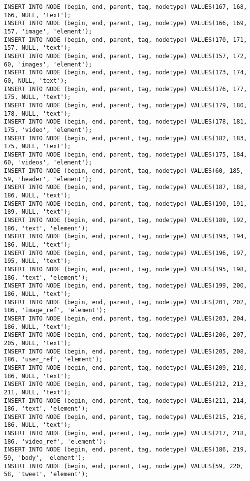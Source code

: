 \begin{verbatim}
INSERT INTO NODE (begin, end, parent, tag, nodetype) VALUES(167, 168, 166, NULL, 'text');
INSERT INTO NODE (begin, end, parent, tag, nodetype) VALUES(166, 169, 157, 'image', 'element');
INSERT INTO NODE (begin, end, parent, tag, nodetype) VALUES(170, 171, 157, NULL, 'text');
INSERT INTO NODE (begin, end, parent, tag, nodetype) VALUES(157, 172, 60, 'images', 'element');
INSERT INTO NODE (begin, end, parent, tag, nodetype) VALUES(173, 174, 60, NULL, 'text');
INSERT INTO NODE (begin, end, parent, tag, nodetype) VALUES(176, 177, 175, NULL, 'text');
INSERT INTO NODE (begin, end, parent, tag, nodetype) VALUES(179, 180, 178, NULL, 'text');
INSERT INTO NODE (begin, end, parent, tag, nodetype) VALUES(178, 181, 175, 'video', 'element');
INSERT INTO NODE (begin, end, parent, tag, nodetype) VALUES(182, 183, 175, NULL, 'text');
INSERT INTO NODE (begin, end, parent, tag, nodetype) VALUES(175, 184, 60, 'videos', 'element');
INSERT INTO NODE (begin, end, parent, tag, nodetype) VALUES(60, 185, 59, 'header', 'element');
INSERT INTO NODE (begin, end, parent, tag, nodetype) VALUES(187, 188, 186, NULL, 'text');
INSERT INTO NODE (begin, end, parent, tag, nodetype) VALUES(190, 191, 189, NULL, 'text');
INSERT INTO NODE (begin, end, parent, tag, nodetype) VALUES(189, 192, 186, 'text', 'element');
INSERT INTO NODE (begin, end, parent, tag, nodetype) VALUES(193, 194, 186, NULL, 'text');
INSERT INTO NODE (begin, end, parent, tag, nodetype) VALUES(196, 197, 195, NULL, 'text');
INSERT INTO NODE (begin, end, parent, tag, nodetype) VALUES(195, 198, 186, 'text', 'element');
INSERT INTO NODE (begin, end, parent, tag, nodetype) VALUES(199, 200, 186, NULL, 'text');
INSERT INTO NODE (begin, end, parent, tag, nodetype) VALUES(201, 202, 186, 'image_ref', 'element');
INSERT INTO NODE (begin, end, parent, tag, nodetype) VALUES(203, 204, 186, NULL, 'text');
INSERT INTO NODE (begin, end, parent, tag, nodetype) VALUES(206, 207, 205, NULL, 'text');
INSERT INTO NODE (begin, end, parent, tag, nodetype) VALUES(205, 208, 186, 'user_ref', 'element');
INSERT INTO NODE (begin, end, parent, tag, nodetype) VALUES(209, 210, 186, NULL, 'text');
INSERT INTO NODE (begin, end, parent, tag, nodetype) VALUES(212, 213, 211, NULL, 'text');
INSERT INTO NODE (begin, end, parent, tag, nodetype) VALUES(211, 214, 186, 'text', 'element');
INSERT INTO NODE (begin, end, parent, tag, nodetype) VALUES(215, 216, 186, NULL, 'text');
INSERT INTO NODE (begin, end, parent, tag, nodetype) VALUES(217, 218, 186, 'video_ref', 'element');
INSERT INTO NODE (begin, end, parent, tag, nodetype) VALUES(186, 219, 59, 'body', 'element');
INSERT INTO NODE (begin, end, parent, tag, nodetype) VALUES(59, 220, 58, 'tweet', 'element');

\end{verbatim}
